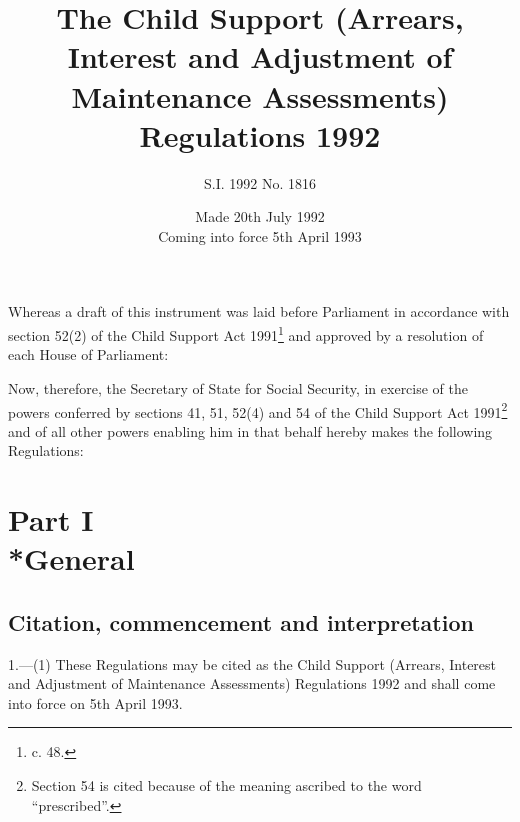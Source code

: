 \documentclass[a4paper]{article}
\title{The Child Support (Arrears, Interest and Adjustment of Maintenance Assessments) Regulations 1992}
\author{S.I. 1992 No. 1816}
\date{Made 20th July 1992\\Coming into force 5th April 1993}
\newcommand{\parthead}{}
\begin{document}
\maketitle

\noindent
 Whereas a draft of this instrument was laid before Parliament in accordance with section 52(2) of the Child Support Act 1991\footnote{ c. 48.} and approved by a resolution of each House of Parliament:

Now, therefore, the Secretary of State for Social Security, in exercise of the powers conferred by sections 41, 51, 52(4) and 54 of the Child Support Act 1991\footnote{\frenchspacing Section 54 is cited because of the meaning ascribed to the word “prescribed”.} and of all other powers enabling him in that behalf hereby makes the following Regulations: 

{\sloppy

\tableofcontents

}

\setcounter{secnumdepth}{-2}

\section[Part I --- General]{Part I\\*General}

\renewcommand\parthead{--- Part I}

\subsection[1. Citation, commencement and interpretation]{Citation, commencement and interpretation}

1.—(1) These Regulations may be cited as the Child Support (Arrears, Interest and Adjustment of Maintenance Assessments) Regulations 1992 and shall come into force on 5th April 1993.
\end{document}
